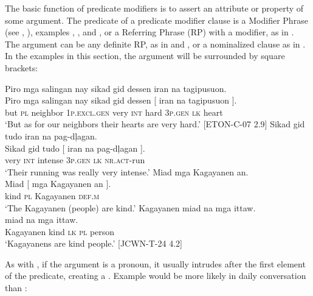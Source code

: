 The basic function of predicate modifiers is to assert an attribute or property of some argument. The predicate of a predicate modifier clause is a Modifier Phrase (see , ), examples , , and , or a Referring Phrase (RP) with a modifier, as in . The argument can be any definite RP, as in  and , or a nominalized clause as in . In the examples in this section, the argument will be surrounded by square brackets: 

\ea
\label{bkm:Ref329869322}\label{bkm:Ref442279471}
Piro  mga  salingan  nay  sikad  gid  dessen  iran  na  tagipusuon. \\\smallskip
\gll Piro  mga  salingan  nay  sikad  gid  dessen [ iran  na  tagipusuon ]. \\
but  \textsc{pl}  neighbor  1\textsc{p.excl.gen}  very  \textsc{int}  hard {} 3\textsc{p.gen}  \textsc{lk}  heart \\
\glt ‘But as for our neighbors their hearts are very hard.’ [ETON-C-07 2.9]
\z
\ea
\label{bkm:Ref428973739}
Sikad  gid  tudo  iran  na  pag-dļagan. \\\smallskip
\gll Sikad  gid  tudo [ iran  na  pag-dļagan{ } ]. \\
very  \textsc{int}  intense {} 3\textsc{p.gen}  \textsc{lk}  \textsc{nr.act}-run \\
\glt ‘Their running was really very intense.’
\z
\ea
\label{bkm:Ref428973723}\label{bkm:Ref442631809}
Miad    mga  Kagayanen  an. \\\smallskip
\gll Miad  [ mga  Kagayanen  an{ }]. \\
kind   {} \textsc{pl}  Kagayanen  \textsc{def.m} \\
\glt ‘The Kagayanen (people) are kind.’
\z
\ea
\label{bkm:Ref445618532}
Kagayanen  miad  na  mga  ittaw. \\\smallskip
\gll [ Kagayanen ] miad  na  mga  ittaw. \\
{} Kagayanen {} kind  \textsc{lk}  \textsc{pl}  person \\
\glt ‘Kagayanens are kind people.’ [JCWN-T-24 4.2]
\z

As with , if the argument is a pronoun, it usually intrudes after the first element of the predicate, creating a . Example  would be more likely in daily conversation than : 

